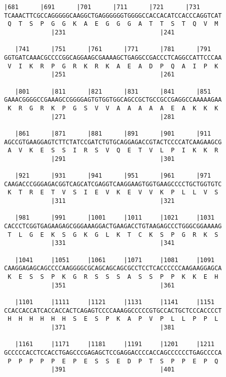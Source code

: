 \documentclass{article}
\begin{document}
\begin{Verbatim}[fontfamily=courier]
   |681      |691      |701      |711      |721      |731   
TCAAACTTCGCCAGGGGGCAAGGCTGAGGGGGGTGGGGCCACCACATCCACCCAGGTCAT
 Q  T  S  P  G  G  K  A  E  G  G  G  A  T  T  S  T  Q  V  M 
             |231                          |241             

   |741      |751      |761      |771      |781      |791   
GGTGATCAAACGCCCCGGCAGGAAGCGAAAAGCTGAGGCCGACCCTCAGGCCATTCCCAA
 V  I  K  R  P  G  R  K  R  K  A  E  A  D  P  Q  A  I  P  K 
             |251                          |261             

   |801      |811      |821      |831      |841      |851   
GAAACGGGGCCGAAAGCCGGGGAGTGTGGTGGCAGCCGCTGCCGCCGAGGCCAAAAAGAA
 K  R  G  R  K  P  G  S  V  V  A  A  A  A  A  E  A  K  K  K 
             |271                          |281             

   |861      |871      |881      |891      |901      |911   
AGCCGTGAAGGAGTCTTCTATCCGATCTGTGCAGGAGACCGTACTCCCCATCAAGAAGCG
 A  V  K  E  S  S  I  R  S  V  Q  E  T  V  L  P  I  K  K  R 
             |291                          |301             

   |921      |931      |941      |951      |961      |971   
CAAGACCCGGGAGACGGTCAGCATCGAGGTCAAGGAAGTGGTGAAGCCCCTGCTGGTGTC
 K  T  R  E  T  V  S  I  E  V  K  E  V  V  K  P  L  L  V  S 
             |311                          |321             

   |981      |991      |1001     |1011     |1021     |1031  
CACCCTCGGTGAGAAGAGCGGGAAAGGACTGAAGACCTGTAAGAGCCCTGGGCGGAAAAG
 T  L  G  E  K  S  G  K  G  L  K  T  C  K  S  P  G  R  K  S 
             |331                          |341             

   |1041     |1051     |1061     |1071     |1081     |1091  
CAAGGAGAGCAGCCCCAAGGGGCGCAGCAGCAGCGCCTCCTCACCCCCCAAGAAGGAGCA
 K  E  S  S  P  K  G  R  S  S  S  A  S  S  P  P  K  K  E  H 
             |351                          |361             

   |1101     |1111     |1121     |1131     |1141     |1151  
CCACCACCATCACCACCACTCAGAGTCCCCAAAGGCCCCCGTGCCACTGCTCCCACCCCT
 H  H  H  H  H  H  S  E  S  P  K  A  P  V  P  L  L  P  P  L 
             |371                          |381             

   |1161     |1171     |1181     |1191     |1201     |1211  
GCCCCCACCTCCACCTGAGCCCGAGAGCTCCGAGGACCCCACCAGCCCCCCTGAGCCCCA
 P  P  P  P  P  E  P  E  S  S  E  D  P  T  S  P  P  E  P  Q 
             |391                          |401             

\end{Verbatim}
\end{document}
